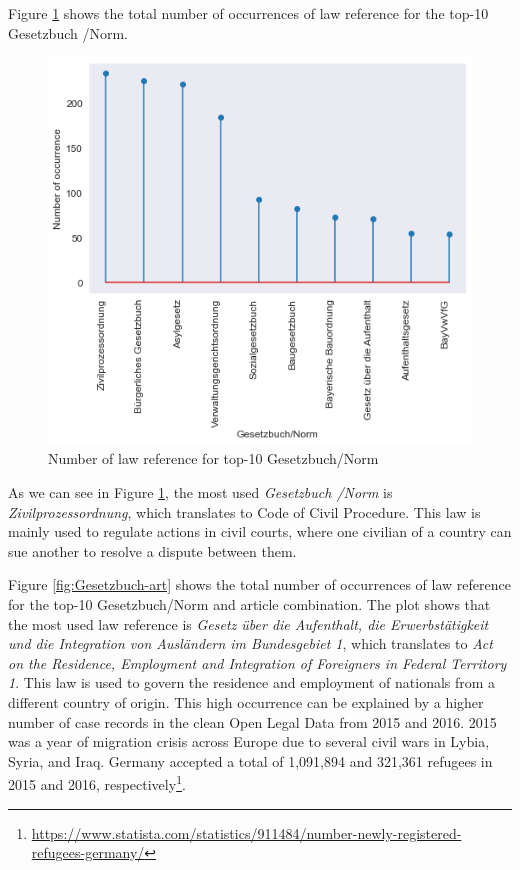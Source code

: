 \documentclass[sigconf]{acmart}
\begin{document}
Figure \ref{fig:Gesetzbuch} shows the total number of occurrences of law reference for the top-10 Gesetzbuch /Norm.

\begin{figure}
    \centering
    \includegraphics[width=1.0\linewidth]{latex/gesetzbuch.png}
   \caption{Number of law reference for top-10 Gesetzbuch/Norm}
   \label{fig:Gesetzbuch}
\end{figure}

As we can see in Figure \ref{fig:Gesetzbuch}, the most used \textit{Gesetzbuch /Norm} is \textit{Zivilprozessordnung}, which translates to Code of Civil Procedure. This law is mainly used to regulate actions in civil courts, where one civilian of a country can sue another to resolve a dispute between them.

Figure \ref{fig:Gesetzbuch-art} shows the total number of occurrences of law reference for the top-10 Gesetzbuch/Norm and article combination. The plot shows that the most used law reference is \textit{Gesetz über die Aufenthalt, die Erwerbstätigkeit und die Integration von Ausländern im Bundesgebiet 1}, which translates to \textit{Act on the Residence, Employment and Integration of Foreigners in Federal Territory 1}. This law is used to govern the residence and employment of nationals from a different country of origin. This high occurrence can be explained by a higher number of case records in the clean Open Legal Data from 2015 and 2016. 2015 was a year of migration crisis across Europe due to several civil wars in Lybia, Syria, and Iraq. Germany accepted a total of 1,091,894 and 321,361 refugees in 2015 and 2016, respectively\footnote{\url{https://www.statista.com/statistics/911484/number-newly-registered-refugees-germany/}}.
\end{document}
